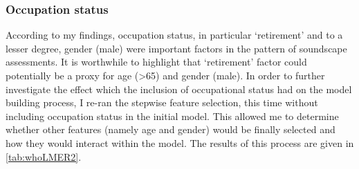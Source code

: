 \subsubsection*{Occupation status}
According to my findings, occupation status, in particular `retirement' and to a lesser degree, gender (male) were important factors in the pattern of soundscape assessments. It is worthwhile to highlight that `retirement' factor could potentially be a proxy for age (>65) and gender (male). In order to further investigate the effect which the inclusion of occupational status had on the model building process, I re-ran the stepwise feature selection, this time without including occupation status in the initial model. This allowed me to determine whether other features (namely age and gender) would be finally selected and how they would interact within the model. The results of this process are given in \cref{tab:whoLMER2}. 



\begin{table}
\centering
\caption{Linear mixed effects model resulting from the feature selection process when the initial model does not include occupational status. **$p<0.01$, *$p>0.05$  \label{tab:whoLMER2}}
\label{tab:whoLMER2}
\end{table}



